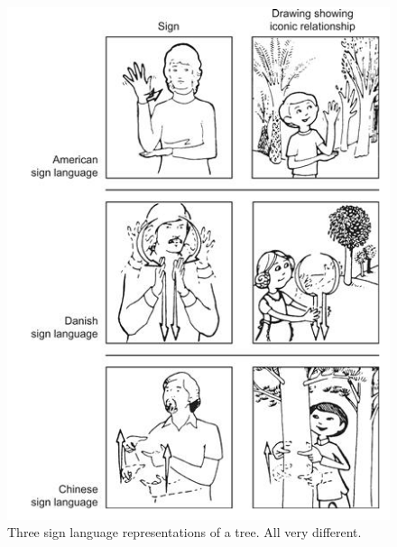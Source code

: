 \begin{mdframed}
\begin{multicols}{2}
\begin{figure}[H]\centering
    \includegraphics[width=0.65\linewidth]{sign_language.png}
    \caption{Three sign language representations of a tree. All very different.}
\end{figure}

\end{multicols}\end{mdframed}



